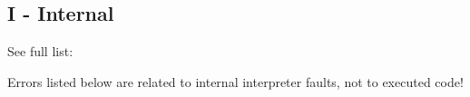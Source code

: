 \newpage
\subsection{I - Internal}\label{sec:error_code_i}


See full list: 

\noindent Errors listed below are related to internal interpreter faults, not to executed code!






